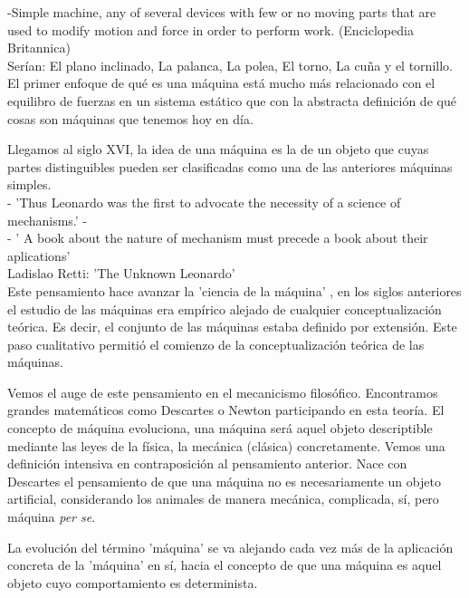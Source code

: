 -Simple machine, any of several devices with few or no moving parts that are used to modify motion and force in order to perform work. (Enciclopedia Britannica) \\


Serían: El plano inclinado, La palanca, La polea, El torno, La cuña y el tornillo. El primer enfoque de qué es una máquina está mucho más relacionado con el equilibro de fuerzas en un sistema estático que con la abstracta definición de qué cosas son máquinas que tenemos hoy en día. 

\vspace{10px}

Llegamos al siglo XVI, la idea de una máquina es la de un objeto que cuyas partes distinguibles pueden ser clasificadas como una de las anteriores máquinas simples. \\

- 'Thus Leonardo was the first to advocate the necessity of a science of mechanisms.' -  \\

- ' A book about the nature of mechanism must precede a book about their aplications' \\

Ladislao Retti: 'The Unknown Leonardo' \\

Este pensamiento hace avanzar la 'ciencia de la máquina' , en los siglos anteriores el estudio de las máquinas era empírico alejado de cualquier conceptualización teórica. Es decir, el conjunto de las máquinas estaba definido por extensión. Este paso cualitativo permitió el comienzo de la conceptualización teórica de las máquinas.

\vspace{10px}

Vemos el auge de este pensamiento en el mecanicismo filosófico. Encontramos grandes matemáticos como Descartes o Newton participando en esta teoría. El concepto de máquina evoluciona, una máquina será aquel objeto descriptible mediante las leyes de la física, la mecánica (clásica) concretamente. Vemos una definición intensiva en contraposición al pensamiento anterior. Nace con Descartes el pensamiento de que una máquina no es necesariamente un objeto artificial, considerando los animales de manera mecánica, complicada, sí, pero máquina \textit{per se}. 


La evolución del término 'máquina' se va alejando cada vez más de la aplicación concreta de la 'máquina' en sí, hacia el concepto de que una máquina es aquel objeto cuyo comportamiento es determinista. \\

